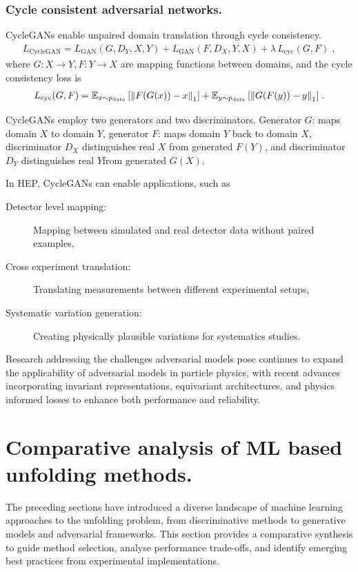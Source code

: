     \subsubsection{Cycle consistent adversarial networks.}
        CycleGANs enable unpaired domain translation through cycle consistency.
        \begin{gather}
            L_{\text{CycleGAN}} = L_{\text{GAN}}(G, D_Y, X, Y) + L_{\text{GAN}}(F, D_X, Y, X) + \lambda\,L_{\text{cyc}}(G, F)\;,
        \end{gather}
        where \(G: X \rightarrow Y, F: Y \rightarrow X\) are mapping functions between domains, and the cycle consistency loss is
        \begin{gather}
            L_{\text{cyc}}(G, F) = \operatorname{\mathbb{E}}_{x \sim p_{\text{data}}}\qty[\norm{F(G(x)) - x}_1] + \operatorname{\mathbb{E}}_{y \sim p_{\text{data}}}\qty[\norm{G(F(y)) - y}_1] \;.
        \end{gather}
        
        CycleGANs employ two generators and two discriminators.
        Generator \(G\): maps domain \(X\) to domain \(Y\), generator \(F\): maps domain \(Y\) back to domain \(X\), discriminator \(D_X\) distinguishes real \(X\) from generated \(F(Y)\), and discriminator \(D_Y\) distinguishes real \(Y\)from generated \(G(X)\).
        

        In HEP, CycleGANs can enable applications, such as
        \begin{description}
            \item[Detector level mapping:] Mapping between simulated and real detector data without paired examples,
            \item[Cross experiment translation:] Translating measurements between different experimental setups,
            \item[Systematic variation generation:] Creating physically plausible variations for systematics studies.
        \end{description}
        
    Research addressing the challenges adversarial models pose continues to expand the applicability of adversarial models in particle physics, with recent advances incorporating invariant representations, equivariant architectures, and physics informed losses to enhance both performance and reliability.
    
\section{Comparative analysis of ML based unfolding methods.}
\sectionminitoc
    The preceding sections have introduced a diverse landscape of machine learning approaches to the unfolding problem, from discriminative methods to generative models and adversarial frameworks.
    This section provides a comparative synthesis to guide method selection, analyse performance trade-offs, and identify emerging best practices from experimental implementations.
